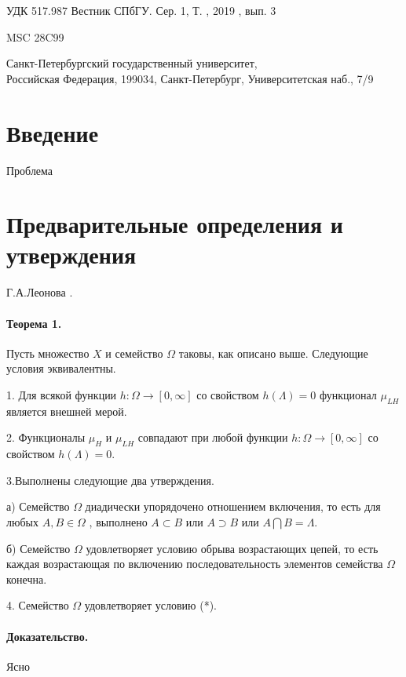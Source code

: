 \documentclass[10pt]{article}
\begin{document}
\noindent УДК 517.987 \hfill Вестник СПбГУ. Сер. 1, Т. , 2019 , вып. 3

\noindent MSC 28C99

\medskip


\medskip


{\small
\noindent Санкт-Петербургский государственный университет, \\
Российская Федерация, 199034, Санкт-Петербург, Университетская наб., 7/9
}

\section{Введение}

 Проблема
\section{Предварительные определения и утверждения}
 Г.А.Леонова \cite{leonov} .


\paragraph*{Теорема 1.} 
Пусть множество $X$ и семейство $\Omega$ таковы, как описано выше. 
Следующие условия эквивалентны.

    1. Для всякой функции $h: \Omega \to [0, \infty]$ со свойством 
    $h(\Lambda) = 0$ функционал $\mu_{LH}$ является внешней мерой. 
    
    2. Функционалы $\mu_H$ и $\mu_{LH}$ совпадают  при любой функции 
    $h: \Omega \to [0, \infty]$ со свойством $h(\Lambda) = 0$.
    
    3.Выполнены следующие два утверждения.
    
        а) Семейство $\Omega$ диадически упорядочено отношением включения, 
        то есть для любых $A, B \in \Omega$ , выполнено $A \subset B $
        или $ A \supset B$ или $A \bigcap B = \Lambda$.
        
        б) Семейство $\Omega$ удовлетворяет условию обрыва возрастающих цепей, 
        то есть каждая возрастающая по включению последовательность элементов
        семейства $\Omega$ конечна.
        
    4.  Семейство $\Omega$ удовлетворяет условию (*). 
    
\paragraph*{Доказательство.}
Ясно
\end{document}
